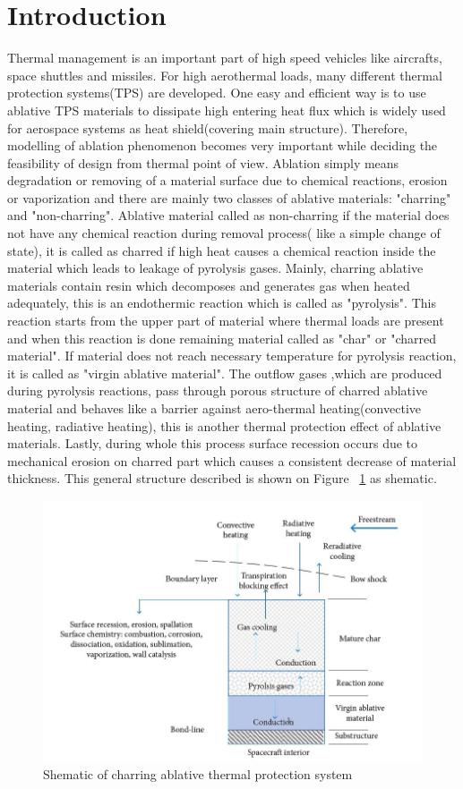 \documentclass[a4paper, 12pt]{article} %
\begin{document}
\section{Introduction} \label{sec:first_intro}
Thermal management is an important part of high speed vehicles like aircrafts, space shuttles and missiles. For high aerothermal loads, many different thermal protection systems(TPS) are developed. One easy and efficient way is to use ablative TPS materials to dissipate high entering heat flux which is widely used for aerospace systems as heat shield(covering main structure). Therefore, modelling of ablation phenomenon becomes very important while deciding the feasibility of  design from thermal point of view. Ablation simply means degradation or removing of a material surface due to chemical reactions, erosion or vaporization and there are mainly two classes of ablative materials: "charring" and "non-charring". Ablative material called as non-charring if the material does not have any chemical reaction during removal process( like a simple change of state), it is called as charred if high heat causes a chemical reaction inside the material which leads to leakage of pyrolysis gases. Mainly, charring ablative materials contain resin which decomposes and generates gas when heated adequately, this is an endothermic reaction which is called as "pyrolysis". This reaction starts from the upper part of material where thermal loads are present and when this reaction is done remaining material called as "char" or "charred material". If material does not reach necessary temperature for pyrolysis reaction, it is called as "virgin ablative material". The outflow gases ,which are produced during pyrolysis reactions, pass through porous structure of charred ablative material and behaves like a barrier against aero-thermal heating(convective heating, radiative heating), this is another thermal protection effect of ablative materials. Lastly, during whole this process surface recession occurs due to mechanical erosion on charred part which causes a consistent decrease of material thickness. This general structure described is shown on Figure ~\ref{fig:char_model} as shematic\cite{mazz}. \newline
\begin{figure}[h!]
  \includegraphics[width=\linewidth]{char_model.jpg}
  \caption{Shematic of charring ablative thermal protection system}
  \label{fig:char_model}
\end{figure}
\end{document}
